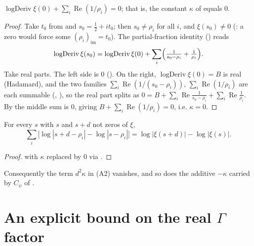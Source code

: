 \begin{lemma}[$\kappa=0$]
\label{lem:le_kappa_zero}
\leanok
{}
$\operatorname{logDeriv}\xi(0)+\sum_i\operatorname{Re}(1/\rho_i)=0$; that is, the
constant $\kappa$ of  equals $0$.
\end{lemma}

\begin{proof}
\leanok
Take $t_0$ from  and $s_0=\tfrac12+it_0$; then
$s_0\ne\rho_i$ for all $i$, and $\xi(s_0)\ne 0$
(: a zero would force some
$(\rho_i)_{\mathrm{im}}=t_0$). The partial-fraction identity 
() reads
\[
  \operatorname{logDeriv}\xi(s_0)
  =\operatorname{logDeriv}\xi(0)+\sum_i\Bigl(\tfrac1{s_0-\rho_i}+\tfrac1{\rho_i}\Bigr).
\]
Take real parts. The left side is $0$ (). On the right,
$\operatorname{logDeriv}\xi(0)=B$ is real (Hadamard), and the two families
$\sum_i\operatorname{Re}(1/(s_0-\rho_i))$, $\sum_i\operatorname{Re}(1/\rho_i)$ are each
summable (, ),
so the real part splits as
$0=B+\sum_i\operatorname{Re}\tfrac1{s_0-\rho_i}+\sum_i\operatorname{Re}\tfrac1{\rho_i}$.
By  the middle sum is $0$, giving
$B+\sum_i\operatorname{Re}(1/\rho_i)=0$, i.e. $\kappa=0$.
\end{proof}

\begin{corollary}
\label{lem:le_shift_no_kappa}
\leanok
{}
For every $s$ with $s$ and $s+d$ not zeros of $\xi$,
\[
  \sum_i\bigl[\log|s+d-\rho_i|-\log|s-\rho_i|\bigr]=\log|\xi(s+d)|-\log|\xi(s)| .
\]
\end{corollary}

\begin{proof}
\leanok
{} with $\kappa$ replaced by $0$ via .
\end{proof}

Consequently the term $d^2\kappa$ in (A2) vanishes, and so does the additive $-\kappa$
carried by $C_\psi$ of .

\section{An explicit bound on the real \texorpdfstring{$\Gamma$}{Gamma} factor}
\label{sec:le_gamma}

